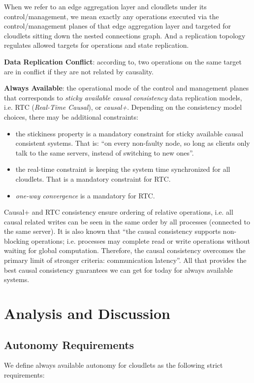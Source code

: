 \documentclass[conference]{IEEEtran}
\begin{document}
When we refer to an edge aggregation layer and cloudlets under its
control/management, we mean exactly any operations executed via the
control/management planes of that edge aggregation layer and targeted for
cloudlets sitting down the nested connections graph. And a replication topology
regulates allowed targets for operations and state replication.

\textbf{Data Replication Conflict}: according to\cite{b1}, two operations on
the same target are in conflict if they are not related by causality.

\textbf{Always Available}: the operational mode of the control and management
planes that corresponds to \textit{sticky available causal
consistency}\cite{b4} data replication models, i.e. RTC (\textit{Real-Time
Causal}\cite{b2}), or \textit{causal+}\cite{b1}. Depending on the consistency
model choices, there may be additional constraints:
\begin{itemize}
  \item the stickiness property is a mandatory constraint for sticky available
    causal consistent systems. That is: ``on every non-faulty node, so long
    as clients only talk to the same servers, instead of switching to new
    ones''\cite{b4}.
  \item the real-time constraint is keeping the system time synchronized for
    all cloudlets. That is a mandatory constraint for RTC.
  \item \textit{one-way convergence}\cite{b2} is a mandatory for RTC.
\end{itemize}
Causal+ and RTC consistency ensure ordering of relative operations, i.e. all
causal related writes can be seen in the same order by all processes (connected
to the same server). It is also known that ``the causal consistency supports
non-blocking operations; i.e. processes may complete read or write operations
without waiting for global computation. Therefore, the causal consistency
overcomes the primary limit of stronger criteria: communication
latency''\cite{b6}. All that provides the best causal consistency guarantees we
can get for today for always available systems.

\section{Analysis and Discussion}
\subsection{Autonomy Requirements}
We define always available autonomy for cloudlets as the following strict
requirements:
\end{document}
